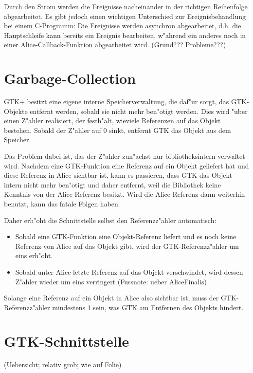 \documentclass{article}
\begin{document}
Durch den Strom werden die Ereignisse nacheinander in der richtigen
Reihenfolge abgearbeitet. Es gibt jedoch einen wichtigen Unterschied
zur Ereignisbehandlung bei einem C-Programm: Die Ereignisse werden asynchron
abgearbeitet, d.h. die Hauptschleife kann bereits ein Ereignis bearbeiten,
w"ahrend ein anderes noch in einer Alice-Callback-Funktion abgearbeitet wird.
(Grund??? Probleme???)

\section{Garbage-Collection}

GTK+ besitzt eine eigene interne Speicherverwaltung, die daf"ur sorgt,
das GTK-Objekte entfernt werden, sobald sie nicht mehr ben"otigt werden.
Dies wird "uber einen Z"ahler realisiert, der festh"alt, wieviele
Referenzen auf das Objekt bestehen. Sobald der Z"ahler auf 0 sinkt,
entfernt GTK das Objekt aus dem Speicher.

Das Problem dabei ist, das der Z"ahler zun"achst nur bibliotheksintern
verwaltet wird. Nachdem eine GTK-Funktion eine Referenz
auf ein Objekt geliefert hat und diese Referenz in Alice sichtbar ist,
kann es passieren, dass GTK das Objekt intern nicht mehr ben"otigt und
daher entfernt, weil die Bibliothek keine Kenntnis von der Alice-Referenz
besitzt. Wird die Alice-Referenz dann weiterhin benutzt, kann das fatale
Folgen haben.

Daher erh"oht die Schnittstelle selbst den Referenzz"ahler automatisch:

\begin{itemize}
\item Sobald eine GTK-Funktion eine Objekt-Referenz liefert und es noch keine
      Referenz von Alice auf das Objekt gibt, wird der GTK-Referenzz"ahler
      um eins erh"oht.
\item Sobald unter Alice letzte Referenz auf das Objekt verschwindet, wird
      dessen Z"ahler wieder um eins verringert (Fussnote: ueber AliceFinalis)
\end{itemize}

Solange eine Referenz auf ein Objekt in Alice also sichtbar ist, muss der
GTK-Referenzz"ahler mindestens 1 sein, was GTK am Entfernen des Objekts
hindert.


\section{GTK-Schnittstelle}

(Uebersicht; relativ grob; wie auf Folie)
\end{document}
